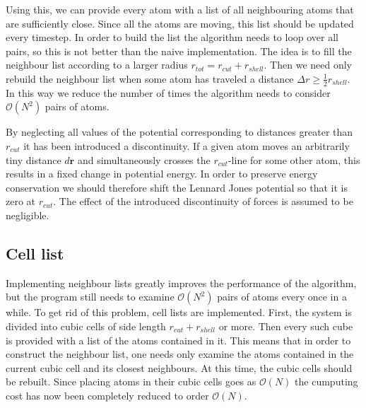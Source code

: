 \documentclass[twoside,utf8]{article}
\begin{document}
\begin{multicols}{2}
\noindent
Using this, we can provide every atom with a list of all neighbouring atoms that are sufficiently close. Since all the atoms are moving, this list should be updated every timestep. In order to build the list the algorithm needs to loop over all pairs, so this is not better than the naive implementation. 
The idea is to fill the neighbour list according to a larger radius $r_{tot}=r_{cut}+r_{shell}$. Then we need only rebuild the neighbour list when some atom has traveled a distance $\Delta r \geq \frac{1}{2}r_{shell}$. In this way we reduce the number of times the algorithm needs to consider $\mathcal{O}(N^2)$ pairs of atoms. 



\begin{center}
\end{center}

\noindent
By neglecting all values of the potential corresponding to distances greater than $r_{cut}$ it has been introduced a discontinuity. If a given atom moves an arbitrarily tiny distance $d\mathbf{r}$ and simultaneously crosses the $r_{cut}$-line for some other atom, this results in a fixed change in potential energy. In order to preserve energy conservation we should therefore shift the Lennard Jones potential so that it is zero at $r_{cut}$. The effect of the introduced discontinuity of forces is assumed to be negligible.



\subsection{Cell list}

\noindent
Implementing neighbour lists greatly improves the performance of the algorithm, but the program still needs to examine $\mathcal{O}(N^2)$ pairs of atoms every once in a while. To get rid of this problem, cell lists are implemented. First, the system is divided into cubic cells of side length $r_{cut}+r_{shell}$ or more. Then every such cube is provided with a list of the atoms contained in it. This means that in order to construct the neighbour list, one needs only examine the atoms contained in the current cubic cell and its closest neighbours. At this time, the cubic cells should be rebuilt. Since placing atoms in their cubic cells goes as $\mathcal{O}(N)$ the cumputing cost has now been completely reduced to order $\mathcal{O}(N)$.



\end{multicols}
\end{document}
